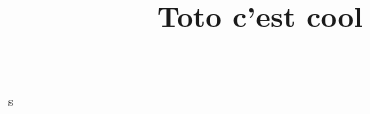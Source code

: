 \documentclass{plasci-secastro}
\title{Toto c'est cool}
\begin{document}
\lipsum
\newpage
s
\end{document}
